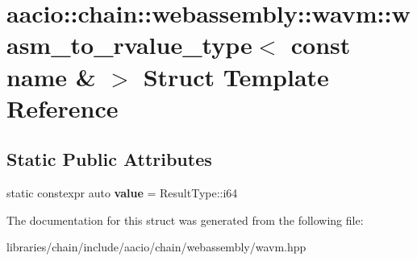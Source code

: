 \hypertarget{structaacio_1_1chain_1_1webassembly_1_1wavm_1_1wasm__to__rvalue__type_3_01const_01name_01_6_01_4}{}\section{aacio\+:\+:chain\+:\+:webassembly\+:\+:wavm\+:\+:wasm\+\_\+to\+\_\+rvalue\+\_\+type$<$ const name \& $>$ Struct Template Reference}
\label{structaacio_1_1chain_1_1webassembly_1_1wavm_1_1wasm__to__rvalue__type_3_01const_01name_01_6_01_4}
\subsection*{Static Public Attributes}
\begin{DoxyCompactItemize}
\item 
\mbox{\label{structaacio_1_1chain_1_1webassembly_1_1wavm_1_1wasm__to__rvalue__type_3_01const_01name_01_6_01_4_a9ec175bbe985d0517355990fa6d03f17}} 
static constexpr auto {\bfseries value} = Result\+Type\+::i64
\end{DoxyCompactItemize}


The documentation for this struct was generated from the following file\+:\begin{DoxyCompactItemize}
\item 
libraries/chain/include/aacio/chain/webassembly/wavm.\+hpp\end{DoxyCompactItemize}
